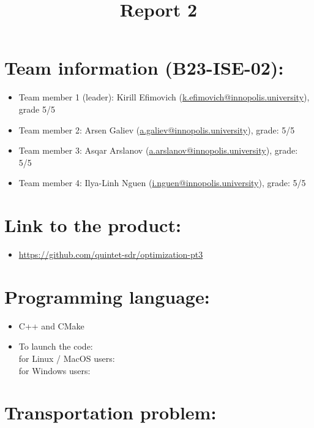 \documentclass{article}
\title{\textbf{Report 2}}
\author{}
\date{}
\begin{document}
\maketitle

\thispagestyle{fancy}

\section*{Team information (B23-ISE-02):}
\begin{itemize}
    \item Team member 1 (leader): Kirill Efimovich (\href{mailto:k.efimovich@innopolis.university}{k.efimovich@innopolis.university}), grade 5/5
    \item Team member 2: Arsen Galiev (\href{mailto:a.galiev@innopolis.university}{a.galiev@innopolis.university}), grade: 5/5
    \item Team member 3: Asqar Arslanov (\href{mailto:a.arslanov@innopolis.university}{a.arslanov@innopolis.university}), grade: 5/5
    \item Team member 4: Ilya-Linh Nguen (\href{mailto:i.nguen@innopolis.university}{i.nguen@innopolis.university}), grade: 5/5
\end{itemize}

\section*{Link to the product:}

\begin{itemize}
    \item \url{https://github.com/quintet-sdr/optimization-pt3}
\end{itemize}

\section*{Programming language:}

\begin{itemize}
    \item C++ and CMake
    \item To launch the code: \\
    for Linux / MacOS users:  \\
    for Windows users: 
\end{itemize}

\section*{Transportation problem:}
\end{document}
